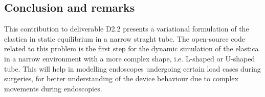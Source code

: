 \subsection{Conclusion and remarks}

This contribution to deliverable D2.2 presents a variational formulation of the elastica in static equilibrium in a narrow straght tube. The open-source code related to this problem is the first step for the dynamic simulation of the elastica in a narrow environment with a more complex shape, i.e. L-shaped or U-shaped tube. This will help in modelling endoscopes undergoing certain load cases during surgeries, for better understanding of the device behaviour due to complex movements during endoscopies.
